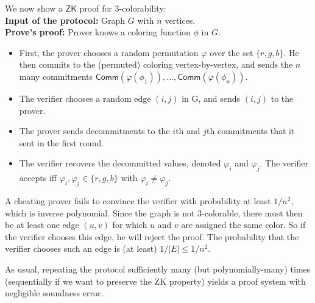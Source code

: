 \documentclass[11pt]{article}
\newcommand{\class}[1]{{\ensuremath{\mathsf{#1}}}}
\newcommand{\zk}{\class{ZK}}
\begin{document}
We now show a $\zk$ proof for 3-colorability: \\
\textbf{Input of the protocol: } Graph $G$ with $n$ vertices.\\
\textbf{Prove's proof: } Prover knows a coloring function $\phi$ in $G$.
\begin{itemize}
\item First, the prover chooses a random permutation $\varphi$ over the set $\{r, g, b\}$. He then commits to the (permuted) coloring vertex-by-vertex, and sends the $n$ many commitments $\class{Comm}(\varphi(\phi_1)), ..., \class{Comm}(\varphi(\phi_n))$.
\item The verifier chooses a random edge $(i, j)$ in G, and sends $(i, j)$ to the prover.
\item The prover sends decommitments to the $i$th and $j$th commitments that it sent in the first round.
\item The verifier recovers the decommitted values, denoted $\varphi_i$ and $\varphi_j$. The verifier accepts iff $\varphi_i, \varphi_j \in \{r, g, b\}$ with $\varphi_i \ne \varphi_j$.
\end{itemize}
A cheating prover fails to convince the verifier with probability at least $1/n^2$, which is inverse polynomial. Since the graph is not 3-colorable, there must then be at least one edge $(u, v)$ for which $u$ and $v$ are assigned the same color. So if the verifier chooses this edge, he will reject the proof. The probability that the verifier chooses such an edge is (at least) $1/|E| \le 1/n^2$.

As usual, repeating the protocol sufficiently many (but polynomially-many) times (sequentially if we want to preserve the ZK property) yields a proof system with negligible soundness error.
\end{document}
